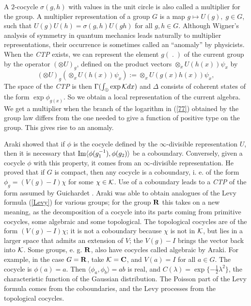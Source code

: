 A $2$-cocycle $\sigma(g,h)$ with values in the unit circle is also
called a multiplier for the group. A multiplier representation of a group
$G$ is a map $g\mapsto U(g),\;g\in G$, such that $U(g)U(h)=\sigma(g,h)U(gh)$
for all $g,h\in G$. Although Wigner's analysis of symmetry in quantum
mechanics leads naturally to multiplier representations, their occurrence
is sometimes called an ``anomaly'' by physicists.
When the {\em CTP} exists, we can represent the element
$g(\;.\;)$ of the current group by the operator $(\otimes U)_g$, defined on
the product vectors $\otimes_x U(h(x))\psi_x$ by
\begin{equation}
(\otimes U)_g(\otimes_x U(h(x))\psi_x):=\otimes_xU(g(x)h(x))\psi_x,
\label{current}
\end{equation}
The space of the {\em CTP} is then $\Gamma(\int_{\oplus}\exp{\cal K}dx)$
and $\Delta$ consists of coherent states of the form $\exp\phi_{g(x)}$.
So we obtain a local representation of the current algebra. We get a
multiplier when the branch of the logarithm in (\ref{77}) obtained by the
group law differs from the one needed to give a function of positive type on
the group. This gives rise to an anomaly.

Araki showed that if $\phi$ is the cocycle defined by the $\infty$-divisible
representation $U$, then it is necessary that ${\rm Im}\langle
\phi(g_1^{-1}),\phi(g_2)\rangle$ be a coboundary. Conversely, given a
cocycle $\phi$
with this property, it comes from an $\infty$-divisible representation.
He proved that if $G$ is compact, then any cocycle is a coboundary, i. e.
of the form $\phi_g=(V(g)-I)\chi$ for some $\chi\in{\cal K}$. Use of
a coboundary leads to a {\em CTP} of the form assumed by
Guichardet \cite{Guichardet}.
Araki was able to obtain
analogues of the Levy formula (\ref{Levy}) for various groups;
for the group ${\bf R}$ this takes on
a new meaning, as the decomposition of a cocycle into its parts
coming from primitive cocycles, some algebraic and some topological.
The topological cocycles are of the form $(V(g)-I)\chi$; it is not a
coboundary because $\chi$ is not in ${\cal K}$, but lies in a larger
space that admits an extension of $V$; the $V(g)-I$ brings the
vector back into ${\cal K}$. Some groups, e. g. ${\bf R}$, also have
cocycles called algebraic by Araki. For example, in the case $G={\bf R}$,
take ${\cal K}={\bf C}$, and $V(a)=I$ for all $a\in G$. The cocycle is
$\phi(a)=a$. Then $\langle\phi_a,\phi_b\rangle=ab$ is real, and $C(\lambda)
=\exp\{-\frac{1}{2}\lambda^2\}$, the characteristic function of the Gaussian
distribution. The Poisson part of the Levy formula comes from
the coboundaries, and the Levy processes from the topological cocycles.

